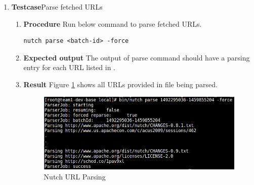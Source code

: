 \begin{enumerate}
\item \textbf{Testcase}\newline Parse fetched URLs
  \begin{enumerate}[label={}]
  \item \textbf{Procedure}\newline
    Run below command to parse fetched URLs.
    \begin{lstlisting}[style=Bash]
      nutch parse <batch-id> -force
    \end{lstlisting}
  \item \textbf{Expected output}\newline
    The output of parse command should have a parsing entry for each
    URL listed in .
  \item \textbf{Result}\newline
    Figure \ref{nutch-parse} shows all URLs provided in  file being parsed.
    \begin{figure}
      \centering
      \includegraphics[scale=0.4]{screenshots/nutch-parse.png}
      \caption{Nutch URL Parsing}
      \label{nutch-parse}
    \end{figure}
  \end{enumerate}


\end{enumerate}
